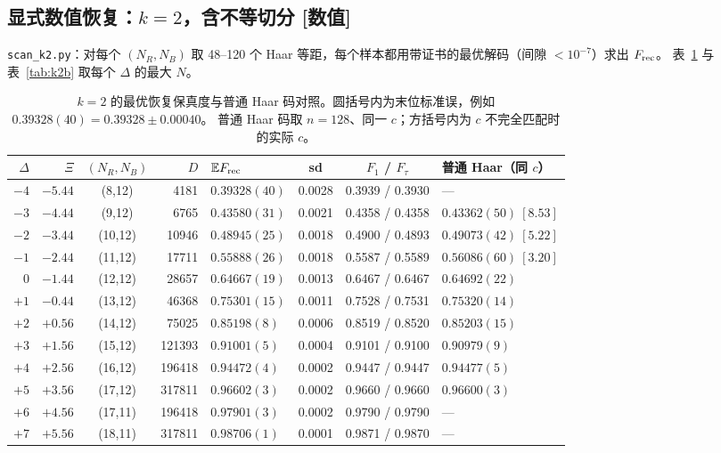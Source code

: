 \documentclass[11pt,a4paper,UTF8]{ctexart}
\newcommand{\E}{\mathbb{E}}
\newcommand{\Frec}{F_{\rm rec}}
\newcommand{\code}[1]{\texttt{#1}}
\newcommand{\tagN}{\texorpdfstring{\textcolor{cN}{\textbf{[数值]}}}{[数值]}}
\begin{document}
\subsection{显式数值恢复：\texorpdfstring{$k=2$}{k=2}，含不等切分 \tagN}\label{ss:C-k2}
\code{scan\_k2.py}：对每个 $(N_R,N_B)$ 取 48--120 个 Haar 等距，每个样本都用带证书的最优解码（间隙 $<10^{-7}$）求出 $\Frec$。
表~\ref{tab:k2a} 与表~\ref{tab:k2b} 取每个 $\Delta$ 的最大 $N$。

\begin{table}[htbp]
\centering\small
\caption{$k=2$ 的最优恢复保真度与普通 Haar 码对照。圆括号内为末位标准误，例如 $0.39328(40)=0.39328\pm0.00040$。
普通 Haar 码取 $n=128$、同一 $c$；方括号内为 $c$ 不完全匹配时的实际 $c$。}\label{tab:k2a}
\begin{tabular}{rrcrlccl}
\toprule
$\Delta$ & $\Xi$ & $(N_R,N_B)$ & $D$ & $\E\Frec$ & sd & $F_1$ / $F_\tau$ & 普通 Haar（同 $c$）\\
\midrule
$-4$ & $-5.44$ & (8,12)  & 4181   & $\mathbf{0.39328}(40)$ & 0.0028 & 0.3939 / 0.3930 & ---\\
$-3$ & $-4.44$ & (9,12)  & 6765   & $\mathbf{0.43580}(31)$ & 0.0021 & 0.4358 / 0.4358 & $0.43362(50)\ [8.53]$\\
$-2$ & $-3.44$ & (10,12) & 10946  & $\mathbf{0.48945}(25)$ & 0.0018 & 0.4900 / 0.4893 & $0.49073(42)\ [5.22]$\\
$-1$ & $-2.44$ & (11,12) & 17711  & $\mathbf{0.55888}(26)$ & 0.0018 & 0.5587 / 0.5589 & $0.56086(60)\ [3.20]$\\
$0$  & $-1.44$ & (12,12) & 28657  & $\mathbf{0.64667}(19)$ & 0.0013 & 0.6467 / 0.6467 & $0.64692(22)$\\
$+1$ & $-0.44$ & (13,12) & 46368  & $\mathbf{0.75301}(15)$ & 0.0011 & 0.7528 / 0.7531 & $0.75320(14)$\\
$+2$ & $+0.56$ & (14,12) & 75025  & $\mathbf{0.85198}(8)$  & 0.0006 & 0.8519 / 0.8520 & $0.85203(15)$\\
$+3$ & $+1.56$ & (15,12) & 121393 & $\mathbf{0.91001}(5)$  & 0.0004 & 0.9101 / 0.9100 & $0.90979(9)$\\
$+4$ & $+2.56$ & (16,12) & 196418 & $\mathbf{0.94472}(4)$  & 0.0002 & 0.9447 / 0.9447 & $0.94477(5)$\\
$+5$ & $+3.56$ & (17,12) & 317811 & $\mathbf{0.96602}(3)$  & 0.0002 & 0.9660 / 0.9660 & $0.96600(3)$\\
$+6$ & $+4.56$ & (17,11) & 196418 & $\mathbf{0.97901}(3)$  & 0.0002 & 0.9790 / 0.9790 & ---\\
$+7$ & $+5.56$ & (18,11) & 317811 & $\mathbf{0.98706}(1)$  & 0.0001 & 0.9871 / 0.9870 & ---\\
\bottomrule
\end{tabular}
\end{table}
\end{document}
